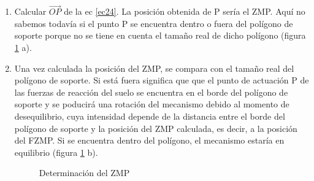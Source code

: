 \begin{enumerate}
\item Calcular $\overrightarrow{OP}$ de la ec \eqref{ec24}. La posición obtenida de P sería el ZMP. Aquí no sabemos todavía si el punto P se encuentra dentro o fuera del polígono de soporte porque no se tiene en cuenta el tamaño real de dicho polígono (figura \ref{figura223} a).

\item Una vez calculada la posición del ZMP, se compara con el tamaño real del polígono de soporte. Si está fuera significa que que el punto de actuación P de las fuerzas de reacción del suelo se encuentra en el borde del polígono de soporte y se poducirá una rotación del mecanismo debido al momento de desequilibrio, cuya intensidad depende de la distancia entre el borde del polígono de soporte y la posición del ZMP calculada, es decir, a la posición del FZMP. Si se encuentra dentro del polígono, el mecanismo estaría en equilibrio (figura \ref{figura223} b).

\begin{figure}[H]
\centering
{}
\quad
{}
\caption{Determinación del ZMP}
\label{figura223}
\end{figure}

\end{enumerate}

